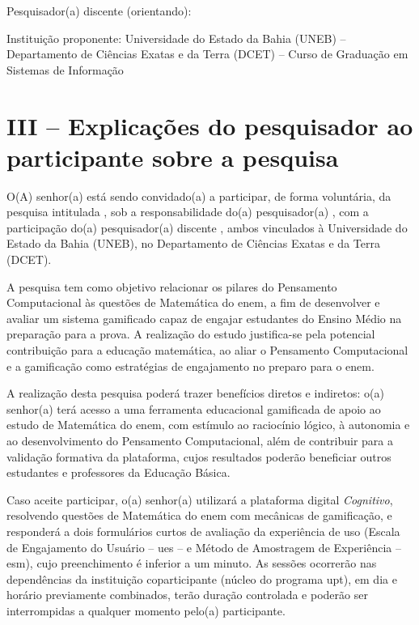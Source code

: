 \noindent Pesquisador(a) discente (orientando): \imprimirautor

\noindent Instituição proponente: Universidade do Estado da Bahia (UNEB) -- Departamento de Ciências Exatas e da Terra (DCET) -- Curso de Graduação em Sistemas de Informação

\section{III -- Explicações do pesquisador ao participante sobre a pesquisa}

O(A) senhor(a) está sendo convidado(a) a participar, de forma voluntária, da pesquisa intitulada \imprimirtitulo, sob a responsabilidade do(a) pesquisador(a) \imprimirorientador, com a participação do(a) pesquisador(a) discente \imprimirautor, ambos vinculados à Universidade do Estado da Bahia (UNEB), no Departamento de Ciências Exatas e da Terra (DCET).

A pesquisa tem como objetivo relacionar os pilares do Pensamento Computacional às questões de Matemática do \gls{enem}, a fim de desenvolver e avaliar um sistema gamificado capaz de engajar estudantes do Ensino Médio na preparação para a prova. A realização do estudo justifica-se pela potencial contribuição para a educação matemática, ao aliar o Pensamento Computacional e a gamificação como estratégias de engajamento no preparo para o \gls{enem}.

A realização desta pesquisa poderá trazer benefícios diretos e indiretos: o(a) senhor(a) terá acesso a uma ferramenta educacional gamificada de apoio ao estudo de Matemática do \gls{enem}, com estímulo ao raciocínio lógico, à autonomia e ao desenvolvimento do Pensamento Computacional, além de contribuir para a validação formativa da plataforma, cujos resultados poderão beneficiar outros estudantes e professores da Educação Básica.

Caso aceite participar, o(a) senhor(a) utilizará a plataforma digital \textit{Cognitivo}, resolvendo questões de Matemática do \gls{enem} com mecânicas de gamificação, e responderá a dois formulários curtos de avaliação da experiência de uso (Escala de Engajamento do Usuário -- \gls{ues} -- e Método de Amostragem de Experiência -- \gls{esm}), cujo preenchimento é inferior a um minuto. As sessões ocorrerão nas dependências da instituição coparticipante (núcleo do programa \gls{upt}), em dia e horário previamente combinados, terão duração controlada e poderão ser interrompidas a qualquer momento pelo(a) participante.

